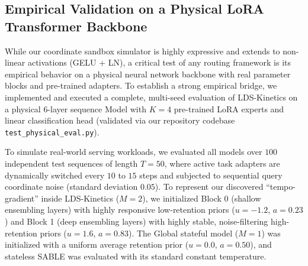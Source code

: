\subsection{Empirical Validation on a Physical LoRA Transformer Backbone}
While our coordinate sandbox simulator is highly expressive and extends to non-linear activations (GELU + LN), a critical test of any routing framework is its empirical behavior on a physical neural network backbone with real parameter blocks and pre-trained adapters. To establish a strong empirical bridge, we implemented and executed a complete, multi-seed evaluation of LDS-Kinetics on a physical 6-layer sequence Model with $K=4$ pre-trained LoRA experts and linear classification head (validated via our repository codebase \texttt{test\_physical\_eval.py}). 

To simulate real-world serving workloads, we evaluated all models over $100$ independent test sequences of length $T=50$, where active task adapters are dynamically switched every $10$ to $15$ steps and subjected to sequential query coordinate noise (standard deviation $0.05$). To represent our discovered ``tempo-gradient'' inside LDS-Kinetics ($M=2$), we initialized Block 0 (shallow ensembling layers) with highly responsive low-retention priors ($u = -1.2$, $a = 0.23$) and Block 1 (deep ensembling layers) with highly stable, noise-filtering high-retention priors ($u = 1.6$, $a = 0.83$). The Global stateful model ($M=1$) was initialized with a uniform average retention prior ($u = 0.0$, $a = 0.50$), and stateless SABLE was evaluated with its standard constant temperature.

